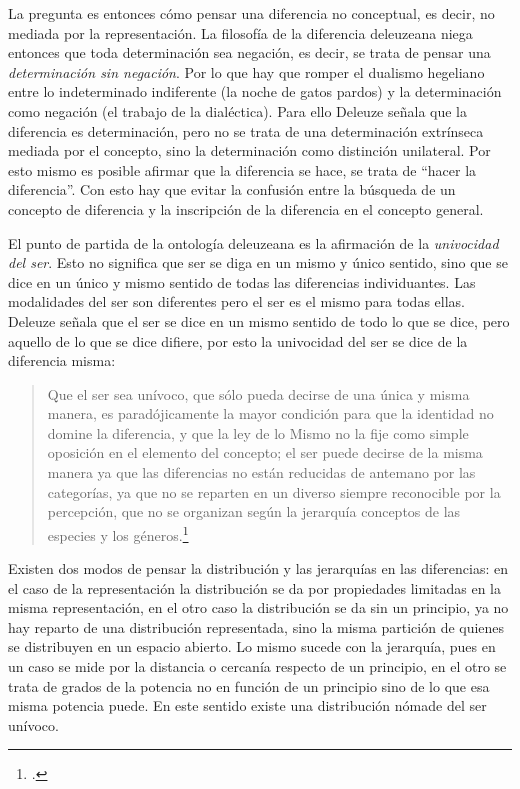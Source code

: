 La pregunta es entonces cómo pensar una diferencia no conceptual, es decir, no mediada por la representación. La filosofía de la diferencia deleuzeana niega entonces que toda determinación sea negación, es decir, se trata de pensar una \emph{determinación sin negación}. Por lo que hay que romper el dualismo hegeliano entre lo indeterminado indiferente (la noche de gatos pardos) y la determinación como negación (el trabajo de la dialéctica). Para ello Deleuze señala que la diferencia es determinación, pero no se trata de una determinación extrínseca mediada por el concepto, sino la determinación como distinción unilateral. Por esto mismo es posible afirmar que la diferencia se hace, se trata de \enquote{hacer la diferencia}. Con esto hay que evitar la confusión entre la búsqueda de un concepto de diferencia y la inscripción de la diferencia en el concepto general.

El punto de partida de la ontología deleuzeana es la afirmación de la \emph{univocidad del ser}. Esto no significa que ser se diga en un mismo y único sentido, sino que se dice en un único y mismo sentido de todas las diferencias individuantes. Las modalidades del ser son diferentes pero el ser es el mismo para todas ellas. Deleuze señala que el ser se dice en un mismo sentido de todo lo que se dice, pero aquello de lo que se dice difiere, por esto la univocidad del ser se dice de la diferencia misma:

\begin{quote}
Que el ser sea unívoco, que sólo pueda decirse de una única y misma manera, es paradójicamente la mayor condición para que la identidad no domine la diferencia, y que la ley de lo Mismo no la fije como simple oposición en el elemento del concepto; el ser puede decirse de la misma manera ya que las diferencias no están reducidas de antemano por las categorías, ya que no se reparten en un diverso siempre reconocible por la percepción, que no se organizan según la jerarquía conceptos de las especies y los géneros.\footcite[42]{@6976-FOUCAULT1995}
\end{quote}

Existen dos modos de pensar la distribución y las jerarquías en las diferencias: en el caso de la representación la distribución se da por propiedades limitadas en la misma representación, en el otro caso la distribución se da sin un principio, ya no hay reparto de una distribución representada, sino la misma partición de quienes se distribuyen en un espacio abierto. Lo mismo sucede con la jerarquía, pues en un caso se mide por la distancia o cercanía respecto de un principio, en el otro se trata de grados de la potencia no en función de un principio sino de lo que esa misma potencia puede. En este sentido existe una distribución nómade del ser unívoco.

